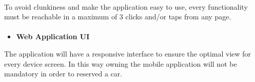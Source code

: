 \documentclass[english]{article}
\begin{document}
\paragraph{}
To avoid clunkiness and make the application easy to use, every functionality must be reachable in a maximum of 3 clicks and/or taps from any page.



 \paragraph{}

\begin{itemize}
	\item{\textbf{Web Application UI}}
\end{itemize}

The application will have a responsive interface to ensure the optimal view for every device screen. In this way owning the mobile application will not be mandatory in order to reserved a car.
\end{document}
